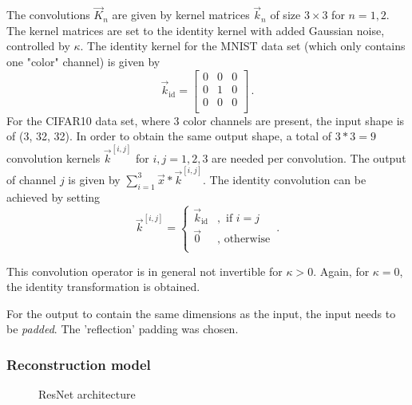 The convolutions $\vec K_n$ are given by kernel matrices $\vec k_n$ of size $3\times3$ for $n=1,2$.
The kernel matrices are set to the identity kernel with added Gaussian noise, controlled by $\kappa$.
The identity kernel for the MNIST data set (which only contains one "color" channel) is given by 
\begin{equation*}
    \vec k_{\text{id}} = \begin{bmatrix}
        0 & 0 & 0 \\
        0 & 1 & 0 \\
        0 & 0 & 0 \\
    \end{bmatrix} \,.
\end{equation*}
For the CIFAR10 data set, where 3 color channels are present, the input shape is of (3, 32, 32). 
In order to obtain the same output shape, 
a total of $3*3=9$ convolution kernels $\vec k^{[i,j]}$ for $i,j=1,2,3$ are needed per convolution.
The output of channel $j$ is given by $\sum_{i=1}^{3} \vec x * \vec k^{[i, j]}$.
The identity convolution can be achieved by setting 
\[
    \vec k^{[i,j]} = \begin{cases}
        \vec k_{\text{id}} &, \text{ if } i = j\\
        \vec 0 &, \text{ otherwise} \\
    \end{cases} \,.
\]

This convolution operator is in general not invertible for $\kappa > 0$.
Again, for $\kappa = 0$, the identity transformation is obtained.

For the output to contain the same dimensions as the input, the input needs to be \textit{padded}.
The 'reflection' padding was chosen.


\subsubsection{Reconstruction model}

\begin{figure}
\begin{minipage}{0.5\textwidth}
\centering

\end{minipage}
\begin{minipage}{0.5\textwidth}
\centering

\end{minipage}
\caption{ResNet architecture}
\label{fig:resnet}
\end{figure}

